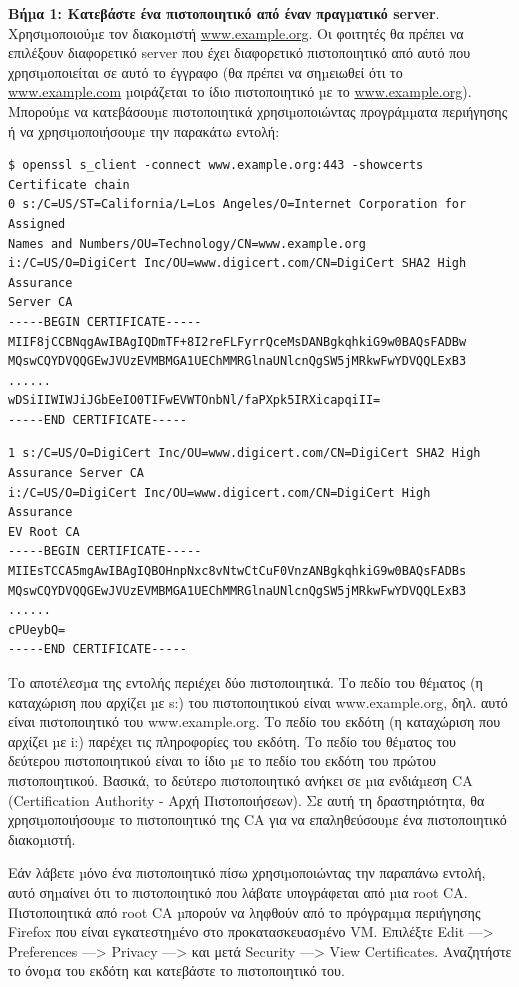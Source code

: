 \noindent
\textbf{Βήµα 1: Κατεβάστε ένα πιστοποιητικό από έναν πραγµατικό server}. Χρησιµοποιούµε τον
διακοµιστή \url{www.example.org}. Οι φοιτητές θα πρέπει να επιλέξουν διαφορετικό server που
έχει διαφορετικό πιστοποιητικό από αυτό που χρησιµοποιείται σε αυτό το έγγραφο (θα πρέπει
να σηµειωθεί ότι το \url{www.example.com} µοιράζεται το ίδιο πιστοποιητικό µε το
\url{www.example.org}). Μπορούµε να κατεβάσουµε πιστοποιητικά χρησιµοποιώντας
προγράµµατα περιήγησης ή να χρησιµοποιήσουµε την παρακάτω εντολή:

\begin{lstlisting}
$ openssl s_client -connect www.example.org:443 -showcerts
Certificate chain
0 s:/C=US/ST=California/L=Los Angeles/O=Internet Corporation for
Assigned
Names and Numbers/OU=Technology/CN=www.example.org
i:/C=US/O=DigiCert Inc/OU=www.digicert.com/CN=DigiCert SHA2 High
Assurance
Server CA
-----BEGIN CERTIFICATE-----
MIIF8jCCBNqgAwIBAgIQDmTF+8I2reFLFyrrQceMsDANBgkqhkiG9w0BAQsFADBw
MQswCQYDVQQGEwJVUzEVMBMGA1UEChMMRGlnaUNlcnQgSW5jMRkwFwYDVQQLExB3
......
wDSiIIWIWJiJGbEeIO0TIFwEVWTOnbNl/faPXpk5IRXicapqiII=
-----END CERTIFICATE-----
\end{lstlisting}
\pagebreak
\begin{lstlisting}
1 s:/C=US/O=DigiCert Inc/OU=www.digicert.com/CN=DigiCert SHA2 High
Assurance Server CA
i:/C=US/O=DigiCert Inc/OU=www.digicert.com/CN=DigiCert High
Assurance
EV Root CA
-----BEGIN CERTIFICATE-----
MIIEsTCCA5mgAwIBAgIQBOHnpNxc8vNtwCtCuF0VnzANBgkqhkiG9w0BAQsFADBs
MQswCQYDVQQGEwJVUzEVMBMGA1UEChMMRGlnaUNlcnQgSW5jMRkwFwYDVQQLExB3
......
cPUeybQ=
-----END CERTIFICATE-----
\end{lstlisting}

\noindent
Το αποτέλεσµα της εντολής περιέχει δύο πιστοποιητικά. Το πεδίο του θέµατος (η καταχώριση
που αρχίζει µε s:) του πιστοποιητικού είναι www.example.org, δηλ. αυτό είναι πιστοποιητικό
του www.example.org. Το πεδίο του εκδότη (η καταχώριση που αρχίζει µε i:) παρέχει τις
πληροφορίες του εκδότη. Το πεδίο του θέµατος του δεύτερου πιστοποιητικού είναι το ίδιο µε το
πεδίο του εκδότη του πρώτου πιστοποιητικού. Βασικά, το δεύτερο πιστοποιητικό ανήκει σε µια
ενδιάµεση CA (Certification Authority - Αρχή Πιστοποιήσεων). Σε αυτή τη δραστηριότητα, θα
χρησιµοποιήσουµε το πιστοποιητικό της CA για να επαληθεύσουµε ένα πιστοποιητικό
διακοµιστή.

\noindent
Εάν λάβετε µόνο ένα πιστοποιητικό πίσω χρησιµοποιώντας την παραπάνω εντολή, αυτό
σηµαίνει ότι το πιστοποιητικό που λάβατε υπογράφεται από µια root CA. Πιστοποιητικά από
root CA µπορούν να ληφθούν από το πρόγραµµα περιήγησης Firefox που είναι εγκατεστηµένο
στο προκατασκευασµένο VM. Επιλέξτε Edit —> Preferences —> Privacy —> και μετά
Security —> View Certificates. Αναζητήστε το όνοµα του εκδότη και κατεβάστε το
πιστοποιητικό του.



